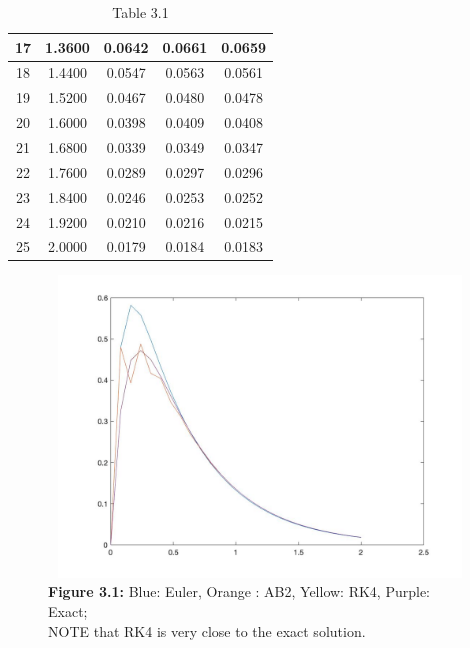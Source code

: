 \documentclass[11pt]{article}
\begin{document}
\begin{table}[htb]
\begin{tabular}{|c|c|c|c|c|}
\hline                                   
17 & 1.3600 & 0.0642 & 0.0661 & 0.0659 \\
\hline                                   
18 & 1.4400 & 0.0547 & 0.0563 & 0.0561 \\
\hline                                   
19 & 1.5200 & 0.0467 & 0.0480 & 0.0478 \\
\hline                                   
20 & 1.6000 & 0.0398 & 0.0409 & 0.0408 \\
\hline                                   
21 & 1.6800 & 0.0339 & 0.0349 & 0.0347 \\
\hline                                   
22 & 1.7600 & 0.0289 & 0.0297 & 0.0296 \\
\hline                                   
23 & 1.8400 & 0.0246 & 0.0253 & 0.0252 \\
\hline                                   
24 & 1.9200 & 0.0210 & 0.0216 & 0.0215 \\
\hline                                   
25 & 2.0000 & 0.0179 & 0.0184 & 0.0183 \\
\hline
\end{tabular}                            
\caption{Table 3.1}                 
\label{table:MyTableLabel}               
\end{table}     
\begin{figure}[!htb]        
\centering                
\includegraphics[width=13cm, height=8cm]{Q3.jpg}
\caption{\textbf{Figure 3.1:} Blue: Euler, Orange : AB2, Yellow: RK4, Purple: Exact; \\NOTE that RK4 is very close to the exact solution.}
\end{figure}
\pagebreak
\end{document}
